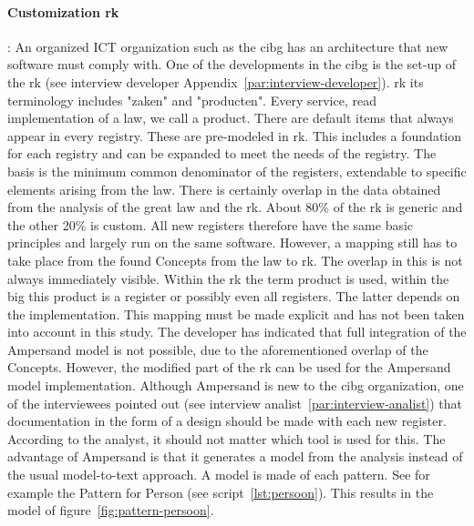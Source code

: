 \paragraph{\textbf{Customization \acrshort{rk}}}\label{swot:o_customization}:
An organized ICT organization such as the \acrshort{cibg} has an architecture that new software must comply with.
One of the developments in the \acrshort{cibg} is the set-up of the \acrshort{rk} (see interview developer Appendix~\ref{par:interview-developer}).
\acrlong{rk} its terminology includes "zaken" and "producten".
Every service, read implementation of a law, we call a product.
There are default items that always appear in every registry.
These are pre-modeled in \acrshort{rk}.
This includes a foundation for each registry and can be expanded to meet the needs of the registry.
The basis is the minimum common denominator of the registers, extendable to specific elements arising from the law.
There is certainly overlap in the data obtained from the analysis of the great law and the \acrshort{rk}.
About 80\% of the \acrshort{rk} is generic and the other 20\% is custom.
All new registers therefore have the same basic principles and largely run on the same software.
However, a mapping still has to take place from the found Concepts from the law to \acrshort{rk}.
The overlap in this is not always immediately visible.
Within the \acrshort{rk} the term product is used, within the \acrshort{big} this product is a register or possibly even all registers.
The latter depends on the implementation.
This mapping must be made explicit and has not been taken into account in this study.
The developer has indicated that full integration of the Ampersand model is not possible, due to the aforementioned overlap of the Concepts.
However, the modified part of the \acrshort{rk} can be used for the Ampersand model implementation.
Although Ampersand is new to the \acrshort{cibg} organization, one of the interviewees pointed out (see interview analist~\ref{par:interview-analist}) that documentation in the form of a design should be made with each new register.
According to the analyst, it should not matter which tool is used for this.
The advantage of Ampersand is that it generates a model from the analysis instead of the usual model-to-text approach.
A model is made of each pattern.
See for example the Pattern for \mbox{Person} (see script~\ref{lst:persoon}).
This results in the model of figure~\ref{fig:pattern-persoon}.
